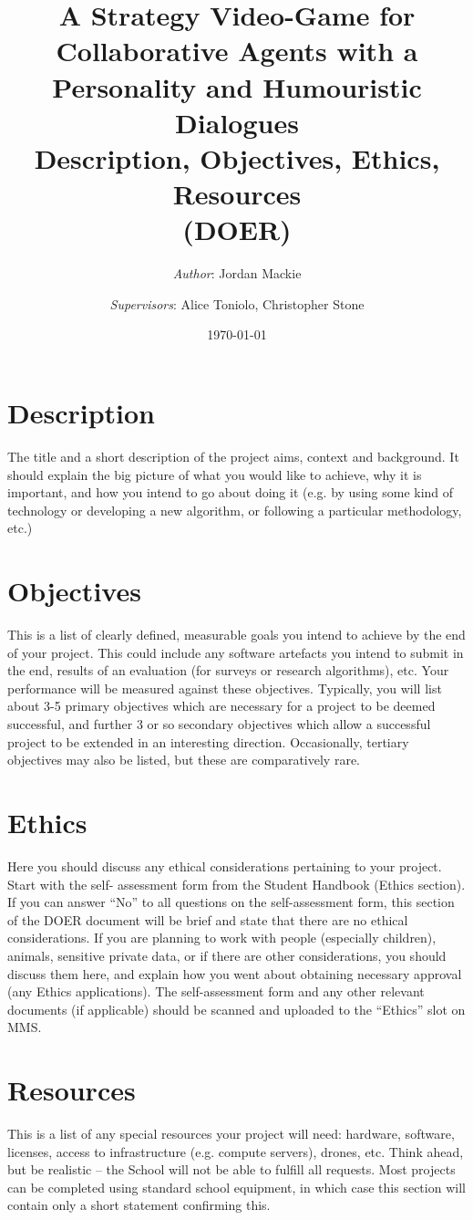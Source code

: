 \documentclass[12pt]{extarticle}
\title{%
  A Strategy Video-Game for Collaborative Agents with a Personality and Humouristic Dialogues \\
  \vspace{5mm} 
  \large Description, Objectives, Ethics, Resources \\
  \large (DOER) \\}
\author{\textit{Author}: Jordan Mackie \and 
{\textit{Supervisors}: Alice Toniolo, Christopher Stone}}
\date{\today}
\begin{document}
\maketitle

\section{Description}

The title and a short description of the project aims,
context and background. It should explain the big
picture of what you would like to achieve, why it is
important, and how you intend to go about doing it (e.g.
by using some kind of technology or developing a new
algorithm, or following a particular methodology, etc.)

\section{Objectives}

This is a list of clearly defined, measurable goals you
intend to achieve by the end of your project. This could
include any software artefacts you intend to submit in
the end, results of an evaluation (for surveys or research
algorithms), etc. Your performance will be measured
against these objectives.
Typically, you will list about 3-5 primary objectives
which are necessary for a project to be deemed
successful, and further 3 or so secondary objectives
which allow a successful project to be extended in an
interesting direction. Occasionally, tertiary objectives
may also be listed, but these are comparatively rare.

\section{Ethics}

Here you should discuss any ethical considerations
pertaining to your project. Start with the self-
assessment form from the Student Handbook (Ethics
section). If you can answer “No” to all questions on the
self-assessment form, this section of the DOER
document will be brief and state that there are no ethical
considerations.
If you are planning to work with people (especially
children), animals, sensitive private data, or if there are
other considerations, you should discuss them here, and
explain how you went about obtaining necessary
approval (any Ethics applications).
The self-assessment form and any other relevant
documents (if applicable) should be scanned and
uploaded to the “Ethics” slot on MMS.

\section{Resources}

This is a list of any special resources your project will
need: hardware, software, licenses, access to
infrastructure (e.g. compute servers), drones, etc. Think
ahead, but be realistic -- the School will not be able to
fulfill all requests.
Most projects can be completed using standard school
equipment, in which case this section will contain only a
short statement confirming this.
\end{document}
